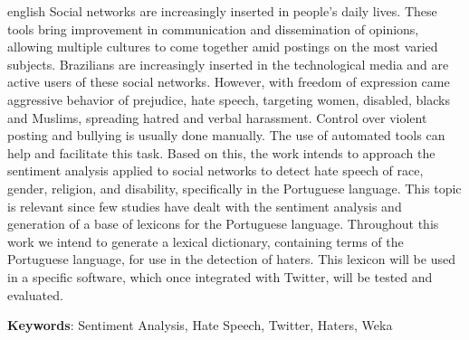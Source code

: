 \begin{resumo}[Abstract]
 \begin{otherlanguage*}{english}
   Social networks are increasingly inserted in people's daily lives. These tools bring improvement in communication and dissemination of opinions, allowing multiple cultures to come together amid postings on the most varied subjects. Brazilians are increasingly inserted in the technological media and are active users of these social networks. However, with freedom of expression came aggressive behavior of prejudice, hate speech, targeting women, disabled, blacks and Muslims, spreading hatred and verbal harassment. Control over violent posting and bullying is usually done manually. The use of automated tools can help and facilitate this task. Based on this, the work intends to approach the sentiment analysis applied to social networks to detect hate speech of race, gender, religion, and disability, specifically in the Portuguese language. This topic is relevant since few studies have dealt with the sentiment analysis and generation of a base of lexicons for the Portuguese language. Throughout this work we intend to generate a lexical dictionary, containing terms of the Portuguese language, for use in the detection of haters. This lexicon will be used in a specific software, which once integrated with Twitter, will be tested and evaluated.

   \vspace{\onelineskip}
 
   \noindent 
   \textbf{Keywords}: Sentiment Analysis, Hate Speech, Twitter, Haters, Weka
 \end{otherlanguage*}
\end{resumo}
